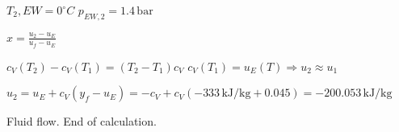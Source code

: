\( T_2, EW = 0^\circ C \)  
\( p_{EW,2} = 1.4 \, \text{bar} \)  

\( x = \frac{u_2 - u_E}{u_f - u_E} \)  

\( c_V(T_2) - c_V(T_1) = (T_2 - T_1) c_V \)  
\( c_V(T_1) = u_E(T) \Rightarrow u_2 \approx u_1 \)  

\( u_2 = u_E + c_V (y_f - u_E) = -c_V + c_V(-333 \, \text{kJ/kg} + 0.045) = -200.053 \, \text{kJ/kg} \)  

Fluid flow.  
End of calculation.